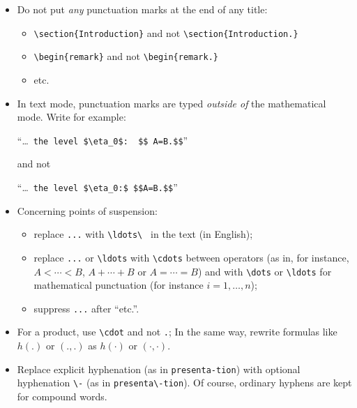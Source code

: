 \documentclass[11pt,english]{smfart}
\begin{document}
\begin{itemize}
\item
Do not put {\em any} punctuation marks at the end of any title:
\begin{itemize}
\item
\verb|\section{Introduction}| and not \verb|\section{Introduction.}|
\item
\verb|\begin{remark}| and not \verb|\begin{remark.}|
\item etc.
\end{itemize}

\item
In text mode, punctuation marks are typed \emph{outside of} the mathematical mode. Write for example:

``\dots\ \verb|the level $\eta_0$:  $$ A=B.$$|''

\noindent and not

``\dots\ \verb|the level $\eta_0:$ $$A=B.$$|''

\item
Concerning points of suspension:
\begin{itemize}
\item
replace \verb|...| with \verb|\ldots\ | in the text (in English);
\item
replace \verb|...| or \verb|\ldots| with \verb|\cdots|
between operators (as in, for instance,
$A<\cdots<B$, $A+\cdots+B$ or $A=\cdots=B$)
and with \verb|\dots| or \verb|\ldots| for mathematical punctuation (for instance $i=1, \dots ,n$);
\item
suppress \verb|...| after ``etc.''.
\end{itemize}
\item
For a product, use \verb|\cdot| and not \verb|.|;
In the same way, rewrite formulas like $h(.)$ or $(.,.)$ as $h(\cdot)$ or
$(\cdot,\cdot)$.

\item
Replace explicit hyphenation (as in \verb|presenta-tion|)
with optional hyphenation \verb|\-| (as in \verb|presenta\-tion|).
Of course, ordinary hyphens are kept for compound words.
\end{itemize}
\end{document}
